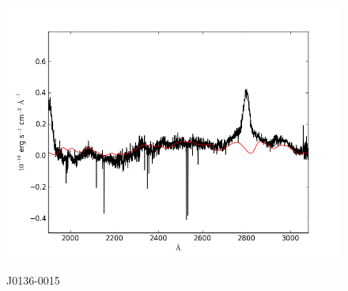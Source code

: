 \documentclass[usenatbib]{mn2e}
\begin{document}
\begin{figure}
\begin{center}
\vspace{5mm}
\includegraphics[width=0.49\linewidth,angle=0]{./red/fe_fit_SBB_13.png}\\

\end{center} 
\caption{J0136-0015\label{fig:landscape}}   
\end{figure}

\newpage
\end{document}
